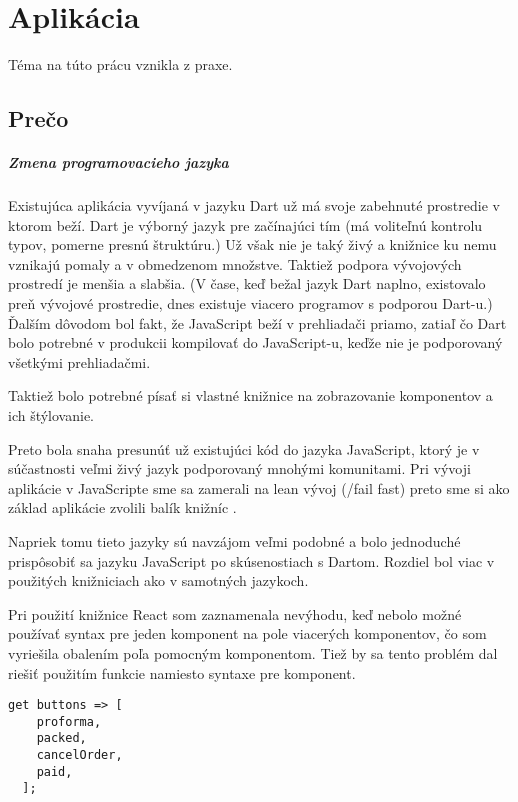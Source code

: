 \chapter{Aplikácia}
Téma na túto prácu vznikla z praxe. 

\section{Prečo}

\paragraph{Zmena programovacieho jazyka}
Existujúca aplikácia vyvíjaná v jazyku Dart už má svoje zabehnuté prostredie v ktorom beží. Dart je výborný jazyk pre začínajúci tím (má voliteľnú kontrolu typov, pomerne presnú štruktúru.) Už však nie je taký živý a knižnice ku nemu vznikajú pomaly a v obmedzenom množstve. 
Taktiež podpora vývojových prostredí je menšia a slabšia. (V čase, keď bežal jazyk Dart naplno, existovalo preň vývojové prostredie, dnes existuje viacero programov s podporou Dart-u.) 
Ďalším dôvodom bol fakt, že JavaScript beží v prehliadači priamo, zatiaľ čo Dart bolo potrebné v produkcii kompilovať do JavaScript-u, keďže nie je podporovaný všetkými prehliadačmi.

Taktiež bolo potrebné písať si vlastné knižnice na zobrazovanie komponentov a ich štýlovanie.

Preto bola snaha presunúť už existujúci kód do jazyka JavaScript, ktorý je v súčastnosti veľmi živý jazyk podporovaný mnohými komunitami. Pri vývoji aplikácie v JavaScripte sme sa zamerali na lean vývoj (/fail fast) preto sme si ako základ aplikácie zvolili balík knižníc \cite[este]{Este}.

Napriek tomu tieto jazyky sú navzájom veľmi podobné a bolo jednoduché prispôsobiť sa jazyku JavaScript po skúsenostiach s Dartom.
Rozdiel bol viac v použitých knižniciach ako v samotných jazykoch.

Pri použití knižnice React som zaznamenala nevýhodu, keď nebolo možné používať syntax pre jeden komponent na pole viacerých komponentov, čo som vyriešila obalením poľa pomocným komponentom. Tiež by sa tento problém dal riešiť použitím funkcie namiesto syntaxe pre komponent.

\begin{lstlisting}[caption=Pole komponentov v Darte]
  get buttons => [
    proforma,
    packed,
    cancelOrder,
    paid,
  ];
\end{lstlisting}

